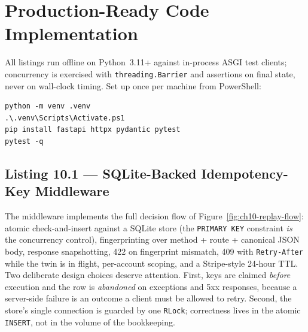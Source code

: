 \section{Production-Ready Code Implementation}
\label{sec:ch10-code}

All listings run offline on Python~3.11+ against in-process ASGI test
clients; concurrency is exercised with \texttt{threading.Barrier} and
assertions on final state, never on wall-clock timing. Set up once per
machine from PowerShell:

\begin{verbatim}
python -m venv .venv
.\.venv\Scripts\Activate.ps1
pip install fastapi httpx pydantic pytest
pytest -q
\end{verbatim}

\subsection{Listing 10.1 --- SQLite-Backed Idempotency-Key Middleware}
\label{sec:ch10-listing1}

The middleware implements the full decision flow of
Figure~\ref{fig:ch10-replay-flow}: atomic check-and-insert against a SQLite
store (the \texttt{PRIMARY KEY} constraint \emph{is} the concurrency
control), fingerprinting over method + route + canonical JSON body, response
snapshotting, 422 on fingerprint mismatch, 409 with \texttt{Retry-After}
while the twin is in flight, per-account scoping, and a Stripe-style 24-hour
TTL. Two deliberate design choices deserve attention. First, keys are
claimed \emph{before} execution and the row is \emph{abandoned} on
exceptions and 5xx responses, because a server-side failure is an outcome a
client must be allowed to retry. Second, the store's single connection is
guarded by one \texttt{RLock}; correctness lives in the atomic
\texttt{INSERT}, not in the volume of the bookkeeping.

